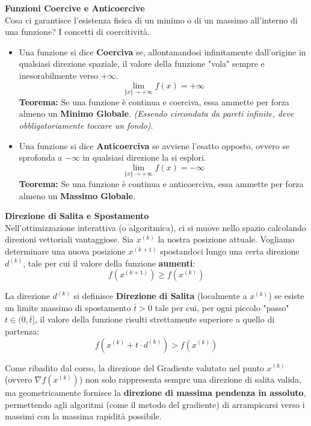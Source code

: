 \documentclass[12pt, a4paper]{article}
\newcommand{\separatore}{\noindent{\color{titlecolor!50}\rule{\textwidth}{0.6pt}}}
\begin{document}
	\textbf{Funzioni Coercive e Anticoercive}\\
	Cosa ci garantisce l'esistenza fisica di un minimo o di un massimo all'interno di una funzione? I concetti di coercitività.
	
	\begin{itemize}
		\item Una funzione si dice \textbf{Coerciva} se, allontanandosi infinitamente dall'origine in qualsiasi direzione spaziale, il valore della funzione "vola" sempre e inesorabilmente verso $+\infty$. 
		\[ \lim_{\Vert x \Vert \to +\infty} f(x) = +\infty \]
		\textbf{Teorema:} Se una funzione è continua e coerciva, essa ammette per forza almeno un \textbf{Minimo Globale}. \textit{(Essendo circondata da pareti infinite, deve obbligatoriamente toccare un fondo)}.
		
		\item Una funzione si dice \textbf{Anticoerciva} se avviene l'esatto opposto, ovvero se sprofonda a $-\infty$ in qualsiasi direzione la si esplori.
		\[ \lim_{\Vert x \Vert \to +\infty} f(x) = -\infty \]
		\textbf{Teorema:} Se una funzione è continua e anticoerciva, essa ammette per forza almeno un \textbf{Massimo Globale}.
	\end{itemize}
	
	\vspace{0.6cm}
	\separatore
	\vspace{0.4cm}
	
	\textbf{Direzione di Salita e Spostamento}\\
	Nell'ottimizzazione interattiva (o algoritmica), ci si muove nello spazio calcolando direzioni vettoriali vantaggiose.
	Sia $x^{(k)}$ la nostra posizione attuale. Vogliamo determinare una nuova posizione $x^{(k+1)}$ spostandoci lungo una certa direzione $d^{(k)}$, tale per cui il valore della funzione \textbf{aumenti}:
	\[ f(x^{(k+1)}) \ge f(x^{(k)}) \]
	
	La direzione $d^{(k)}$ si definisce \textbf{Direzione di Salita} (localmente a $x^{(k)}$) se esiste un limite massimo di spostamento $\bar{t} > 0$ tale per cui, per ogni piccolo "passo" $t \in (0, \bar{t}]$, il valore della funzione risulti strettamente superiore a quello di partenza:
	\[ f(x^{(k)} + t \cdot d^{(k)}) > f(x^{(k)}) \]
	
	Come ribadito dal corso, la direzione del Gradiente valutato nel punto $x^{(k)}$ (ovvero $\nabla f(x^{(k)})$) non solo rappresenta sempre una direzione di salita valida, ma geometricamente fornisce la \textbf{direzione di massima pendenza in assoluto}, permettendo agli algoritmi (come il metodo del gradiente) di arrampicarsi verso i massimi con la massima rapidità possibile.
	
\end{document}
